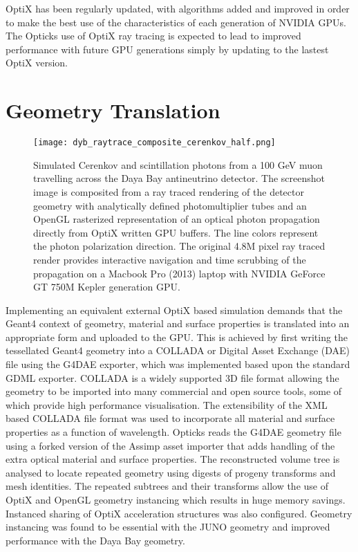 \documentclass[a4paper]{jpconf}
\begin{document}
OptiX has been regularly updated, with algorithms added and improved in order 
to make the best use of the characteristics of each generation of NVIDIA GPUs. 
The Opticks use of OptiX ray tracing is expected to lead to improved performance
with future GPU generations simply by updating to the lastest OptiX version. 


\section{Geometry Translation}

\begin{figure}[htbp]
\centering
\texttt{[image: dyb\_raytrace\_composite\_cerenkov\_half.png]}
\caption{
Simulated Cerenkov and scintillation photons from a 100 GeV muon travelling
across the Daya Bay antineutrino detector. The screenshot image is composited from 
a ray traced rendering of the detector geometry with analytically defined photomultiplier tubes 
and an OpenGL rasterized representation of an optical photon propagation directly from OptiX written GPU buffers. 
The line colors represent the photon polarization direction. The original 4.8M pixel ray traced
render provides interactive navigation and time scrubbing of the propagation on a 
Macbook Pro (2013) laptop with NVIDIA GeForce GT 750M Kepler generation GPU.}
\end{figure}

Implementing an equivalent external OptiX based simulation demands that the Geant4 
context of geometry, material and surface properties is translated into 
an appropriate form and uploaded to the GPU.
This is achieved by first writing the tessellated Geant4 geometry into a 
COLLADA or Digital Asset Exchange (DAE) file using the G4DAE\cite{g4daeURL} exporter, 
which was implemented based upon the standard GDML exporter. 
COLLADA is a widely supported 3D file format allowing the geometry 
to be imported into many commercial and open source tools, some 
of which provide high performance visualisation.
The extensibility of the XML based COLLADA file format was used to 
incorporate all material and surface properties as a function of wavelength.
Opticks reads the G4DAE geometry file using a forked version\cite{AssimpFork} of the
Assimp\cite{Assimp} asset importer that adds handling of the extra optical material and surface
properties. 
The reconstructed volume tree is analysed to locate repeated geometry using digests 
of progeny transforms and mesh identities. The repeated subtrees and their transforms  
allow the use of OptiX and OpenGL geometry instancing which results in huge memory 
savings. Instanced sharing of OptiX acceleration structures was also configured. 
Geometry instancing was found to be essential with the JUNO geometry and improved performance
with the Daya Bay geometry.
\end{document}
